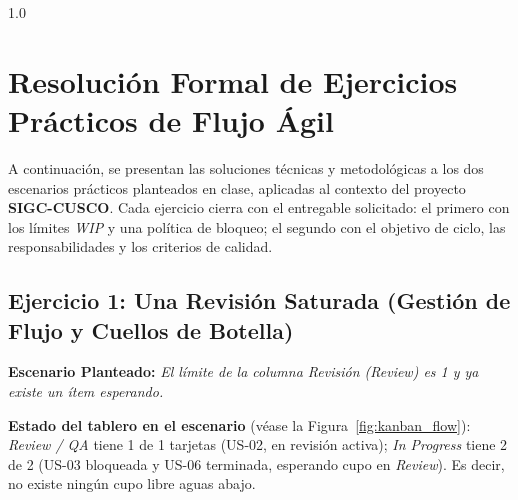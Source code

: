 \documentclass[11pt,a4paper]{article}
\begin{document}
\newpage
\hypersetup{pageanchor=true}
{
    \hypersetup{linkcolor=black}
    \begin{spacing}{1.0}
    \tableofcontents
    \end{spacing}
}
\newpage
{}

\section{Resolución Formal de Ejercicios Prácticos de Flujo Ágil}

A continuación, se presentan las soluciones técnicas y metodológicas a los dos escenarios prácticos planteados en clase, aplicadas al contexto del proyecto \textbf{SIGC-CUSCO}. Cada ejercicio cierra con el entregable solicitado: el primero con los límites \textit{WIP} y una política de bloqueo; el segundo con el objetivo de ciclo, las responsabilidades y los criterios de calidad.

\subsection{Ejercicio 1: Una Revisión Saturada (Gestión de Flujo y Cuellos de Botella)}
\textbf{Escenario Planteado:} \textit{El límite de la columna Revisión (Review) es 1 y ya existe un ítem esperando.}

\textbf{Estado del tablero en el escenario} (véase la Figura~\ref{fig:kanban_flow}): \textit{Review / QA} tiene 1 de 1 tarjetas (US-02, en revisión activa); \textit{In Progress} tiene 2 de 2 (US-03 bloqueada y US-06 terminada, esperando cupo en \textit{Review}). Es decir, no existe ningún cupo libre aguas abajo.
\end{document}

